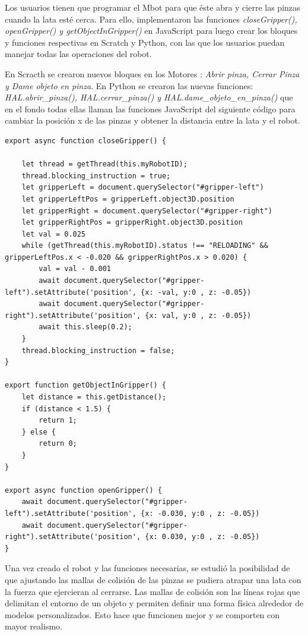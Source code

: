 Los usuarios tienen que programar el Mbot para que éste abra y cierre las pinzas cuando la lata esté cerca. Para ello, implementaron las funciones \textit{closeGripper(), openGripper() y getObjectInGripper()} en JavaScript para luego crear los bloques y funciones respectivas en Scratch y Python, con las que los usuarios puedan manejar todas las operaciones del robot. 
 
En Scracth se crearon nuevos bloques en los Motores : \textit{Abrir pinza, Cerrar Pinza y Dame objeto en pinza}.
En Python  se crearon las nuevas funciones: \textit{HAL.abrir\_pinza(), HAL.cerrar\_pinza() y  HAL.dame\_objeto\_en\_pinza()} que en el fondo todas ellas llaman las funciones JavaScript  del siguiente código para cambiar la posición x de las pinzas y obtener la distancia entre la lata y el robot.
 
\begin{lstlisting}
export async function closeGripper() {

    let thread = getThread(this.myRobotID);
    thread.blocking_instruction = true;
    let gripperLeft = document.querySelector("#gripper-left")
    let gripperLeftPos = gripperLeft.object3D.position
    let gripperRight = document.querySelector("#gripper-right")
    let gripperRightPos = gripperRight.object3D.position
    let val = 0.025
    while (getThread(this.myRobotID).status !== "RELOADING" && gripperLeftPos.x < -0.020 && gripperRightPos.x > 0.020) {
        val = val - 0.001
        await document.querySelector("#gripper-left").setAttribute('position', {x: -val, y:0 , z: -0.05})
        await document.querySelector("#gripper-right").setAttribute('position', {x: val, y:0 , z: -0.05})
        await this.sleep(0.2);
    }
    thread.blocking_instruction = false;
}

export function getObjectInGripper() {
    let distance = this.getDistance();
    if (distance < 1.5) {
        return 1;
    } else {
        return 0;
    }
}

export async function openGripper() {
    await document.querySelector("#gripper-left").setAttribute('position', {x: -0.030, y:0 , z: -0.05})
    await document.querySelector("#gripper-right").setAttribute('position', {x: 0.030, y:0 , z: -0.05})
}
\end{lstlisting}


Una vez creado el robot y las funciones necesarias, se estudió la posibilidad de que ajustando  las mallas de colisión de las pinzas se pudiera atrapar una lata con la fuerza que ejercieran al cerrarse. 
Las mallas de colisión son las líneas rojas que delimitan el entorno de un objeto y permiten definir una forma física alrededor de modelos personalizados. Esto hace que funcionen mejor y se comporten con mayor realismo.

